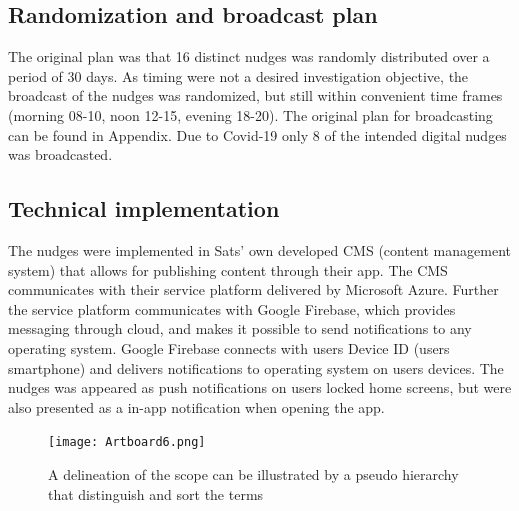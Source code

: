 \subsection{Randomization and broadcast plan}
The original plan was that 16 distinct nudges was randomly distributed over a period of 30 days. As timing were not a desired investigation objective, the broadcast of the nudges was randomized, but still within convenient time frames (morning 08-10, noon 12-15, evening 18-20). The original plan for broadcasting can be found in Appendix. Due to Covid-19 only 8 of the intended digital nudges was broadcasted. 

\subsection{Technical implementation}
The nudges were implemented in Sats' own developed CMS (content management system) that allows for publishing content through their app. The CMS communicates with their service platform delivered by Microsoft Azure. Further the service platform communicates with Google Firebase, which provides messaging through cloud, and makes it possible to send notifications to any operating system. Google Firebase connects with users Device ID (users smartphone) and delivers notifications to operating system on users devices. The nudges was appeared as push notifications on users locked home screens, but were also presented as a in-app notification when opening the app. 


\bigbreak
\bigbreak
\begin{figure}[ht]
\texttt{[image: Artboard6.png]}
\caption{A delineation of the scope can be illustrated by a pseudo hierarchy that distinguish and sort the terms}
\end{figure}
\bigbreak
\bigbreak


